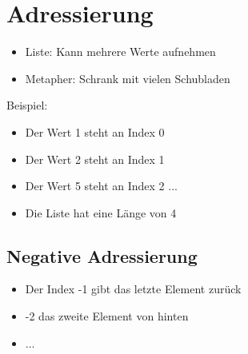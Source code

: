 \section{Adressierung}
\begin{frame}
    \slidehead

    \begin{itemize}
        \item Liste: Kann mehrere Werte aufnehmen
        \item Metapher: Schrank mit vielen Schubladen
    \end{itemize}

    \begin{figure}[!h]
        \centering


    \end{figure}
    \pause
    Beispiel:\\
    \begin{itemize}
        \item Der Wert 1 steht an Index 0
        \item Der Wert 2 steht an Index 1
        \item Der Wert 5 steht an Index 2 ...
        \item Die Liste hat eine Länge von 4
    \end{itemize}
\end{frame}

\subsection{Negative Adressierung}
\begin{frame}
    \slidehead
    \begin{itemize}
        \item Der Index -1 gibt das letzte Element zurück
        \item -2 das zweite Element von hinten
        \item ...
    \end{itemize}
\end{frame}

